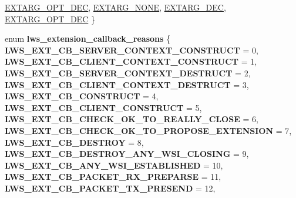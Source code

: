 \begin{DoxyCompactItemize}
\hyperlink{group__extensions_ggacc9f55936dc165257a2e1f7d47bce89ea5265abe3e1c3f64412f2affe7bffd880}{E\+X\+T\+A\+R\+G\+\_\+\+O\+P\+T\+\_\+\+D\+EC}, 
\newline
\hyperlink{group__extensions_ggacc9f55936dc165257a2e1f7d47bce89eaabcf56c456c1ff6e81dc82586a16f14c}{E\+X\+T\+A\+R\+G\+\_\+\+N\+O\+NE}, 
\hyperlink{group__extensions_ggacc9f55936dc165257a2e1f7d47bce89ea1c86adf924c8786a12bee9687094673e}{E\+X\+T\+A\+R\+G\+\_\+\+D\+EC}, 
\hyperlink{group__extensions_ggacc9f55936dc165257a2e1f7d47bce89ea5265abe3e1c3f64412f2affe7bffd880}{E\+X\+T\+A\+R\+G\+\_\+\+O\+P\+T\+\_\+\+D\+EC}
 \}
\item 
\mbox{\label{group__extensions_gae9993815eee72c6070300a0ae2f022d7}} 
enum {\bfseries lws\+\_\+extension\+\_\+callback\+\_\+reasons} \{ \newline
{\bfseries L\+W\+S\+\_\+\+E\+X\+T\+\_\+\+C\+B\+\_\+\+S\+E\+R\+V\+E\+R\+\_\+\+C\+O\+N\+T\+E\+X\+T\+\_\+\+C\+O\+N\+S\+T\+R\+U\+CT} = 0, 
{\bfseries L\+W\+S\+\_\+\+E\+X\+T\+\_\+\+C\+B\+\_\+\+C\+L\+I\+E\+N\+T\+\_\+\+C\+O\+N\+T\+E\+X\+T\+\_\+\+C\+O\+N\+S\+T\+R\+U\+CT} = 1, 
{\bfseries L\+W\+S\+\_\+\+E\+X\+T\+\_\+\+C\+B\+\_\+\+S\+E\+R\+V\+E\+R\+\_\+\+C\+O\+N\+T\+E\+X\+T\+\_\+\+D\+E\+S\+T\+R\+U\+CT} = 2, 
{\bfseries L\+W\+S\+\_\+\+E\+X\+T\+\_\+\+C\+B\+\_\+\+C\+L\+I\+E\+N\+T\+\_\+\+C\+O\+N\+T\+E\+X\+T\+\_\+\+D\+E\+S\+T\+R\+U\+CT} = 3, 
\newline
{\bfseries L\+W\+S\+\_\+\+E\+X\+T\+\_\+\+C\+B\+\_\+\+C\+O\+N\+S\+T\+R\+U\+CT} = 4, 
{\bfseries L\+W\+S\+\_\+\+E\+X\+T\+\_\+\+C\+B\+\_\+\+C\+L\+I\+E\+N\+T\+\_\+\+C\+O\+N\+S\+T\+R\+U\+CT} = 5, 
{\bfseries L\+W\+S\+\_\+\+E\+X\+T\+\_\+\+C\+B\+\_\+\+C\+H\+E\+C\+K\+\_\+\+O\+K\+\_\+\+T\+O\+\_\+\+R\+E\+A\+L\+L\+Y\+\_\+\+C\+L\+O\+SE} = 6, 
{\bfseries L\+W\+S\+\_\+\+E\+X\+T\+\_\+\+C\+B\+\_\+\+C\+H\+E\+C\+K\+\_\+\+O\+K\+\_\+\+T\+O\+\_\+\+P\+R\+O\+P\+O\+S\+E\+\_\+\+E\+X\+T\+E\+N\+S\+I\+ON} = 7, 
\newline
{\bfseries L\+W\+S\+\_\+\+E\+X\+T\+\_\+\+C\+B\+\_\+\+D\+E\+S\+T\+R\+OY} = 8, 
{\bfseries L\+W\+S\+\_\+\+E\+X\+T\+\_\+\+C\+B\+\_\+\+D\+E\+S\+T\+R\+O\+Y\+\_\+\+A\+N\+Y\+\_\+\+W\+S\+I\+\_\+\+C\+L\+O\+S\+I\+NG} = 9, 
{\bfseries L\+W\+S\+\_\+\+E\+X\+T\+\_\+\+C\+B\+\_\+\+A\+N\+Y\+\_\+\+W\+S\+I\+\_\+\+E\+S\+T\+A\+B\+L\+I\+S\+H\+ED} = 10, 
{\bfseries L\+W\+S\+\_\+\+E\+X\+T\+\_\+\+C\+B\+\_\+\+P\+A\+C\+K\+E\+T\+\_\+\+R\+X\+\_\+\+P\+R\+E\+P\+A\+R\+SE} = 11, 
\newline
{\bfseries L\+W\+S\+\_\+\+E\+X\+T\+\_\+\+C\+B\+\_\+\+P\+A\+C\+K\+E\+T\+\_\+\+T\+X\+\_\+\+P\+R\+E\+S\+E\+ND} = 12, 

\end{DoxyCompactItemize}
